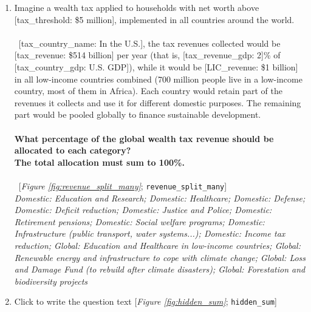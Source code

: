 \begin{enumerate}[resume]
\item  \label{q:revenue_split_many} Imagine a wealth tax applied to households with net worth above [tax\_threshold: \$5 million], implemented in all countries around the world.
~\\\\ 
~[tax\_country\_name: In the U.S.], the tax revenues collected would be [tax\_revenue: \$514 billion] per year (that is, [tax\_revenue\_gdp: 2]\% of [tax\_country\_gdp: U.S. GDP]), while it would be [LIC\_revenue: \$1 billion] in all low-income countries combined (700 million people live in a low-income country, most of them in Africa).
Each country would retain part of the revenues it collects and use it for different domestic purposes. The remaining part would be pooled globally to finance sustainable development.
~\\\\\textbf{What percentage of the global wealth tax revenue should be allocated to each category?}~\\\textbf{The total allocation must sum to
100\%.}\\\\ 
~[\textit{Figure \ref{fig:revenue_split_many}}; 
\verb|revenue_split_many|]
  \\ \textit{Domestic: Education and Research; Domestic: Healthcare; Domestic: Defense; Domestic: Deficit reduction; Domestic: Justice and Police; Domestic: Retirement pensions; Domestic: Social welfare programs; Domestic: Infrastructure (public transport, water systems...); Domestic: Income tax reduction; Global: Education and Healthcare in low-income countries; Global: Renewable energy and infrastructure to cope with climate change; Global: Loss and Damage Fund (to rebuild after climate disasters); Global: Forestation and biodiversity projects}

\item  \label{q:hidden_sum} Click to write the question text [\textit{Figure \ref{fig:hidden_sum}}; 
\verb|hidden_sum|]


\end{enumerate} 

